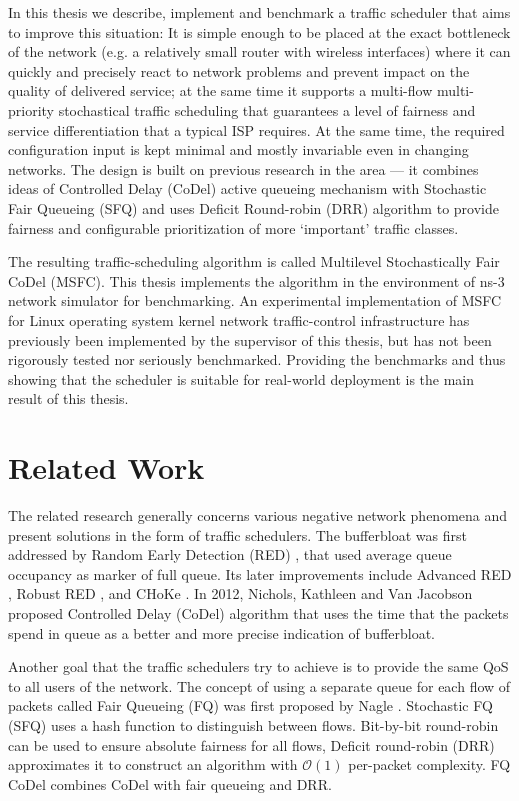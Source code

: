 In this thesis we describe, implement and benchmark a traffic scheduler that aims to improve this situation: It is simple enough to be placed at the exact bottleneck of the network (e.g. a relatively small router with wireless interfaces) where it can quickly and precisely react to network problems and prevent impact on the quality of delivered service; at the same time it supports a multi-flow multi-priority stochastical traffic scheduling that guarantees a level of fairness and service differentiation that a typical ISP requires. At the same time, the required configuration input is kept minimal and mostly invariable even in changing networks. The design is built on previous research in the area --- it combines ideas of Controlled Delay (CoDel) \cite{CoDel} active queueing mechanism with Stochastic Fair Queueing (SFQ) \cite{SFQ} and uses Deficit Round-robin (DRR) \cite{EffDRR} algorithm to provide fairness and configurable prioritization of more `important' traffic classes.

The resulting traffic-scheduling algorithm is called Multilevel Stochastically Fair CoDel (MSFC). This thesis implements the algorithm in the environment of ns-3 network simulator \cite{ns3} for benchmarking. An experimental implementation of MSFC for Linux operating system kernel network traffic-control infrastructure has previously been implemented by the supervisor of this thesis, but has not been rigorously tested nor seriously benchmarked. Providing the benchmarks and thus showing that the scheduler is suitable for real-world deployment is the main result of this thesis.


\section*{Related Work}
The related research generally concerns various negative network phenomena and present solutions in the form of traffic schedulers. The bufferbloat was first addressed by Random Early Detection (RED) \cite{Floyd:1993:RED:169931.169935}, that used average queue occupancy as marker of full queue. Its later improvements include Advanced RED \cite{Floyd01adaptivered:}, Robust RED \cite{RRED}, and CHoKe \cite{pan2000choke}. In 2012, Nichols, Kathleen and Van Jacobson proposed Controlled Delay (CoDel) algorithm that uses the time that the packets spend in queue as a better and more precise indication of bufferbloat.

Another goal that the traffic schedulers try to achieve is to provide the same QoS to all users of the network. The concept of using a separate queue for each flow of packets called Fair Queueing (FQ) was first proposed by Nagle \cite{Nagle:FQ}. Stochastic FQ (SFQ) \cite{SFQ} uses a hash function to distinguish between flows. Bit-by-bit round-robin \cite{demers1989analysis} can be used to ensure absolute fairness for all flows, Deficit round-robin (DRR) \cite{EffDRR} approximates it to construct an algorithm with $\mathcal{O}(1)$ per-packet complexity. FQ CoDel \cite{fq_codel} combines CoDel with fair queueing and DRR.

